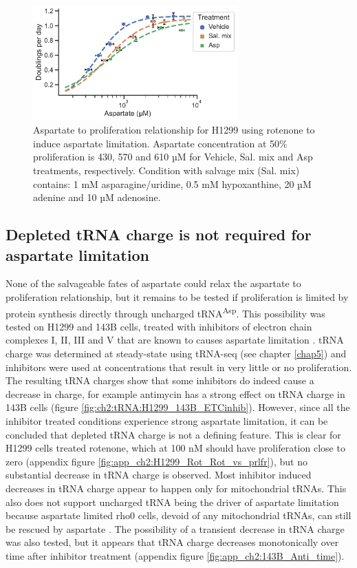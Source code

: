 \begin{figure}
    \centering
    \includegraphics[width=0.7\textwidth]{figures/chap2/H1299_Rot_Asp_vs_prlfr_noPyr.pdf}
    \caption[H1299 rotenone titration aspartate to proliferation.]{
    Aspartate to proliferation relationship for H1299 using rotenone to induce aspartate limitation.
    Aspartate concentration at 50\% proliferation is 430, 570 and 610 µM for Vehicle, Sal. mix and Asp treatments, respectively.
    Condition with salvage mix (Sal. mix) contains: 1 mM asparagine/uridine, 0.5 mM hypoxanthine, 20 µM adenine and 10 µM adenosine.
    }
    \label{fig:ch2:H1299_Rot_Asp_vs_prlfr}
\end{figure}




\subsection{Depleted tRNA charge is not required for aspartate limitation}
None of the salvageable fates of aspartate could relax the aspartate to proliferation relationship, but it remains to be tested if proliferation is limited by protein synthesis directly through uncharged tRNA\textsuperscript{Asp}.
This possibility was tested on H1299 and 143B cells, treated with inhibitors of electron chain complexes I, II, III and V that are known to causes aspartate limitation \cite{Sullivan2015-xf, Hart2023-gp}.
tRNA charge was determined at steady-state using tRNA-seq (see chapter \ref{chap5}) and inhibitors were used at concentrations that result in very little or no proliferation.
The resulting tRNA charges show that some inhibitors do indeed cause a decrease in charge, for example antimycin has a strong effect on tRNA charge in 143B cells (figure \ref{fig:ch2:tRNA:H1299_143B_ETCinhib}).
However, since all the inhibitor treated conditions experience strong aspartate limitation, it can be concluded that depleted tRNA charge is not a defining feature.
This is clear for H1299 cells treated rotenone, which at 100 nM should have proliferation close to zero (appendix figure \ref{fig:app_ch2:H1299_Rot_Rot_vs_prlfr}), but no substantial decrease in tRNA charge is observed.
Most inhibitor induced decreases in tRNA charge appear to happen only for mitochondrial tRNAs.
This also does not support uncharged tRNA being the driver of aspartate limitation because aspartate limited rho0 cells, devoid of any mitochondrial tRNAs, can still be rescued by aspartate \cite{Birsoy2015-pg}.
The possibility of a transient decrease in tRNA charge was also tested, but it appears that tRNA charge decreases monotonically over time after inhibitor treatment (appendix figure \ref{fig:app_ch2:143B_Anti_time}).

